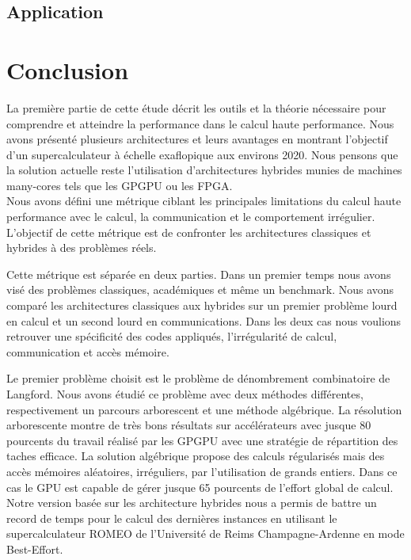 \documentclass[12pt,a4paper]{report}
\begin{document}
\section{Application}

\chapter*{Conclusion}
La première partie de cette étude décrit les outils et la théorie nécessaire pour comprendre et atteindre la performance dans le calcul haute performance. 
Nous avons présenté plusieurs architectures et leurs avantages en montrant l'objectif d'un supercalculateur à échelle exaflopique aux environs 2020. 
Nous pensons que la solution actuelle reste l'utilisation d'architectures hybrides munies de machines many-cores tels que les GPGPU ou les FPGA.\\

Nous avons défini une métrique ciblant les principales limitations du calcul haute performance avec le calcul, la communication et le comportement irrégulier. 
L'objectif de cette métrique est de confronter les architectures classiques et hybrides à des problèmes réels.

Cette métrique est séparée en deux parties. 
Dans un premier temps nous avons visé des problèmes classiques, académiques et même un benchmark. 
Nous avons comparé les architectures classiques aux hybrides sur un premier problème lourd en calcul et un second lourd en communications.
Dans les deux cas nous voulions retrouver une spécificité des codes appliqués, l'irrégularité de calcul, communication et accès mémoire.  

Le premier problème choisit est le problème de dénombrement combinatoire de Langford.
Nous avons étudié ce problème avec deux méthodes différentes, respectivement un parcours arborescent et une méthode algébrique. 
La résolution arborescente montre de très bons résultats sur accélérateurs avec jusque 80 pourcents du travail réalisé par les GPGPU avec une stratégie de répartition des taches efficace. 
La solution algébrique propose des calculs régularisés mais des accès mémoires aléatoires, irréguliers, par l'utilisation de grands entiers. 
Dans ce cas le GPU est capable de gérer jusque 65 pourcents de l'effort global de calcul. 
Notre version basée sur les architecture hybrides nous a permis de battre un record de temps pour le calcul des dernières instances en utilisant le supercalculateur ROMEO de l'Université de Reims Champagne-Ardenne en mode Best-Effort. 
\end{document}
